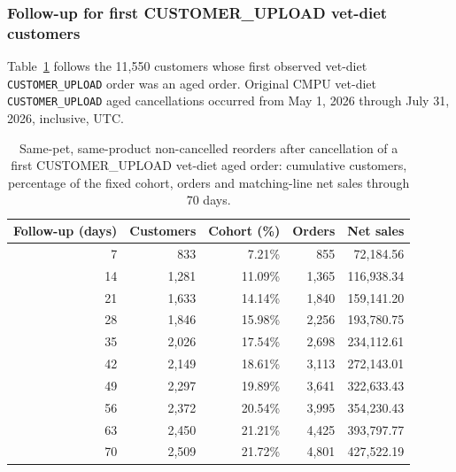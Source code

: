 \clearpage
\subsubsection{Follow-up for first CUSTOMER\_UPLOAD vet-diet customers}
Table~\ref{tab:financial-opportunity-new-upload-follow-up} follows the
11,550 customers whose first observed vet-diet
\texttt{CUSTOMER\_UPLOAD} order was an aged order. Original CMPU vet-diet
\texttt{CUSTOMER\_UPLOAD} aged cancellations occurred from
May 1, 2026 through July 31, 2026, inclusive, UTC.

\begin{table}[!htbp]
\centering
\caption{Same-pet, same-product non-cancelled reorders after cancellation of a first CUSTOMER\_UPLOAD vet-diet aged order: cumulative customers, percentage of the fixed cohort, orders and matching-line net sales through 70 days.}
\label{tab:financial-opportunity-new-upload-follow-up}
\begin{tabular}{@{}rrrrr@{}}
\toprule
Follow-up (days) & Customers & Cohort (\%) & Orders & Net sales \\
\midrule
7 & 833 & 7.21\% & 855 & 72,184.56 \\
14 & 1,281 & 11.09\% & 1,365 & 116,938.34 \\
21 & 1,633 & 14.14\% & 1,840 & 159,141.20 \\
28 & 1,846 & 15.98\% & 2,256 & 193,780.75 \\
35 & 2,026 & 17.54\% & 2,698 & 234,112.61 \\
42 & 2,149 & 18.61\% & 3,113 & 272,143.01 \\
49 & 2,297 & 19.89\% & 3,641 & 322,633.43 \\
56 & 2,372 & 20.54\% & 3,995 & 354,230.43 \\
63 & 2,450 & 21.21\% & 4,425 & 393,797.77 \\
70 & 2,509 & 21.72\% & 4,801 & 427,522.19 \\
\bottomrule
\end{tabular}


\end{table}

